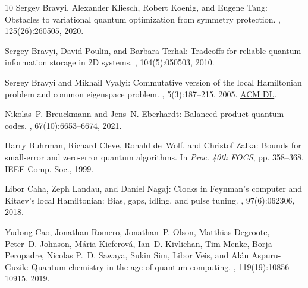 \documentclass[11pt]{article}
\begin{document}
\begin{thebibliography}{10}
{\sc Sergey Bravyi, Alexander Kliesch, Robert Koenig, and Eugene Tang}:
  Obstacles to variational quantum optimization from symmetry protection.
, 125(26):260505, 2020.

{\sc Sergey Bravyi, David Poulin, and Barbara Terhal}: Tradeoffs for reliable
  quantum information storage in {2D} systems.
, 104(5):050503, 2010.

{\sc Sergey Bravyi and Mikhail Vyalyi}: Commutative version of the local
  {H}amiltonian problem and common eigenspace problem.
, 5(3):187--215, 2005.
\newblock \href{https://dl.acm.org/doi/10.5555/2011637.2011639}{ACM DL}.

{\sc Nikolas~P. Breuckmann and Jens~N. Eberhardt}: Balanced product quantum
  codes.
, 67(10):6653--6674, 2021.

{\sc Harry Buhrman, Richard Cleve, Ronald de~Wolf, and Christof Zalka}: Bounds
  for small-error and zero-error quantum algorithms.
\newblock In {\em Proc. 40th FOCS}, pp. 358--368. IEEE Comp. Soc., 1999.

{\sc Libor Caha, Zeph Landau, and Daniel Nagaj}: Clocks in {F}eynman's computer
  and {K}itaev's local {H}amiltonian: Bias, gaps, idling, and pulse tuning.
, 97(6):062306, 2018.

{\sc Yudong Cao, Jonathan Romero, Jonathan~P. Olson, Matthias Degroote,
  Peter~D. Johnson, M{\'a}ria Kieferov{\'a}, Ian~D. Kivlichan, Tim Menke, Borja
  Peropadre, Nicolas P.~D. Sawaya, Sukin Sim, Libor Veis, and Al{\'a}n
  Aspuru-Guzik}: Quantum chemistry in the age of quantum computing.
, 119(19):10856--10915, 2019.


\end{thebibliography}
\end{document}

